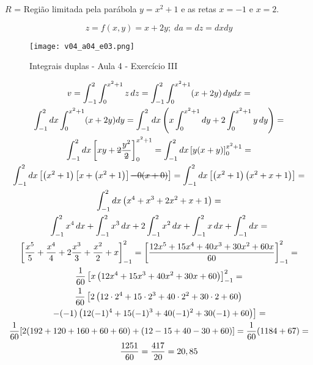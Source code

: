 \begin{enumerate}
	$R$ = Região limitada pela parábola $y = x^2 + 1$ e as retas $x = -1$ e $x = 2$.
	
	\begin{equation*}
		z = f(x,y) = x + 2y;\; da = dz = dx dy
	\end{equation*}
	
	\begin{figure}[htb]
		\caption{Integrais duplas - Aula 4 - Exercício III}
		\label{v04_a04_e03}
		\centering
		\texttt{[image: v04\_a04\_e03.png]}		
	\end{figure}
	
	\begin{gather*}
		v = \int_{-1}^2 \int_0^{x^2 + 1} z\, dz = \int_{-1}^2 \int_0^{x^2 + 1} (x + 2y)\, dy dx =\\ \int_{-1}^2 dx \int_0^{x^2 + 1} (x + 2y) dy = \int_{-1}^2 dx \left(x\int_0^{x^2 + 1} dy + 2\int_0^{x^2 + 1} y\, dy\right) =\\ \int_{-1}^2 dx \left[xy + \overstrike{2}\dfrac{y^2}{\overstrike{2}}\right]_0^{x^2 + 1} = \int_{-1}^2 dx \left[y(x + y)\right]_0^{x^2 + 1} =\\ \int_{-1}^2 dx \left[\left(x^2 + 1\right)\left[x + \left(x^2 + 1\right)\right] \overstrike{- 0(x + 0)}\right] = \int_{-1}^2 dx \left[\left(x^2 + 1\right)\left(x^2 + x + 1\right)\right] =\\ \int_{-1}^2 dx \left(x^4 + x^3 + 2x^2 + x + 1\right) =\\ \int_{-1}^2 x^4\, dx + \int_{-1}^2 x^3\, dx + 2\int_{-1}^2 x^2\, dx + \int_{-1}^2 x\, dx + \int_{-1}^2 dx =\\ \left[\dfrac{x^5}{5} + \dfrac{x^4}{4} + 2\dfrac{x^3}{3} + \dfrac{x^2}{2} + x\right]_{-1}^2 = \left[\dfrac{12x^5 + 15x^4 + 40x^3 + 30x^2 + 60x}{60}\right]_{-1}^2 =\\ \dfrac{1}{60}\left[x\left(12x^4 + 15x^3 + 40x^2 + 30x + 60\right)\right]_{-1}^2 =\\ \dfrac{1}{60}\left[2\left(12\cdot2^4 + 15\cdot2^3 + 40\cdot2^2 + 30\cdot2 + 60\right) \right.\\\left.- (-1)\left(12(-1)^4 + 15(-1)^3 + 40(-1)^2 + 30(-1) + 60\right)\right] =\\ \dfrac{1}{60} [2(192 + 120 + 160 + 60 + 60) + (12 - 15 + 40 - 30 + 60)] = \dfrac{1}{60} (1184 + 67) =\\ \dfrac{1251}{60} = \frac{417}{20} = 20,85
	\end{gather*}
\end{enumerate}